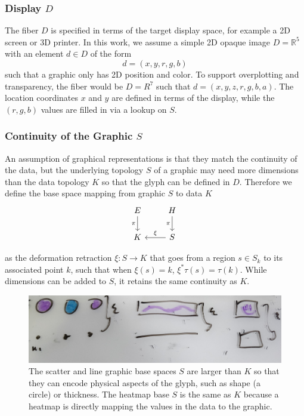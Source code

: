 \documentclass[../main.tex]{subfiles}
\begin{document}
\subsubsection{Display $D$}
\label{sec:graphic_fiber}
The fiber $D$ is specified in terms of the target display space, for example a 2D screen or 3D printer. In this work, we assume a simple 2D opaque image $D=\mathbb{R}^5$ with an element $d \in D$ of the form
\begin{equation}
    d = (x, y, r, g, b)
\end{equation}
such that a graphic only has 2D position and color. To support overplotting and transparency, the fiber would be $D=R^{7}$ such that $d=(x, y, z, r, g, b, a)$. The location coordinates $x$ and $y$ are defined in terms of the display, while the $(r,g,b)$ values are filled in via a lookup on $S$. 

\subsubsection{Continuity of the Graphic $S$} 
\label{sec:graphic_base}
An assumption of graphical representations is that they match the continuity of the data\cite{tufteVisualDisplayQuantitative2001,friendlyBriefHistoryData2008}, but the underlying topology $S$ of a graphic may need more dimensions than the data topology $K$ so that the glyph can be defined in $D$. Therefore we define the base space mapping from graphic $S$ to data $K$ 
\begin{equation}
    \begin{tikzcd}
        E \arrow[d, "\pi"'] & H \arrow[d, "\pi"'] \\
        K                   & S \arrow[l, "\xi"']
        \end{tikzcd}
\end{equation}

 as the deformation retraction \cite{RetractionTopology2020} $\xi: S \rightarrow K$ that goes from a region $s \in S_{k}$ to its associated point $k$, such that when $\xi(s) = k$, $\xi^*\tau(s) = \tau(k)$. While dimensions can be added to $S$, it retains the same continuity as $K$.
 
\begin{figure}
    \includegraphics[width=1\textwidth]{figures/math/retraction_maps.png}
    \caption{The scatter and line graphic base spaces $S$ are larger than $K$ so that they can encode physical aspects of the glyph, such as shape (a circle) or thickness. The heatmap base $S$ is the same as $K$ because a heatmap is directly mapping the values in the data to the graphic.
    }
    \label{fig:graphic_retraction_map}
\end{figure}
\end{document}
